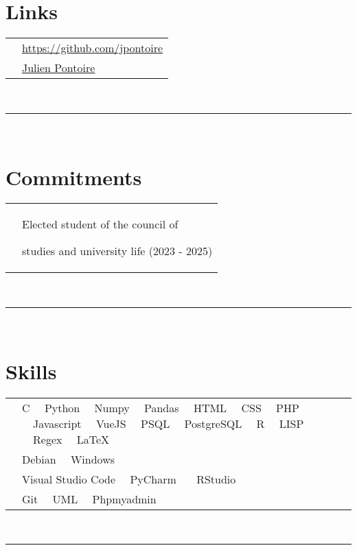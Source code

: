 \documentclass[oneside]{article}
\begin{document}
{\begin{minipage}[t][\textheight-2\fboxsep-2\fboxrule][t]{\dimexpr0.40\textwidth-2\fboxrule-2\fboxsep\relax}
        \section*{\large Links}
        \begin{tabular}{cl}
            \faGithub{}   & \href{https://github.com/jpontoire}{https://github.com/jpontoire} \\
            \faLinkedin{} & \href{https://www.linkedin.com/in/julien-pontoire-0a50a42b1/}{Julien Pontoire} \\
        \end{tabular}
        \vspace{10pt} \\
        \rule{\linewidth}{0.4pt} \\

        \section*{\large Commitments}
        \begin{tabularx}{\textwidth}{cY}
            & Elected student of the council of 
            
            studies and university life (2023 - 2025)
        \end{tabularx}
        \vspace{7pt} \\
        \rule{\linewidth}{0.4pt} \\
        \section*{\large Skills}
        \begin{tabularx}{\textwidth}{cY}
            \faCode{}        & C \ \ Python \ \ Numpy \ \ Pandas \ \ HTML \ \ CSS \ \ PHP \ \ Javascript \ \ VueJS \ \ PSQL \ \ PostgreSQL \ \ R \ \ LISP \ \ Regex \ \ LaTeX \\
            \faCogs{}        & Debian \ \ Windows \\
            \faLaptopCode{}  & Visual Studio Code \ \ PyCharm \ \ \ RStudio \\
            \faToolbox{}     & Git \ \ UML \ \ Phpmyadmin
        \end{tabularx}
        \vspace{1pt} \\
        \rule{\linewidth}{0.4pt}
        

\end{minipage}}
\end{document}
